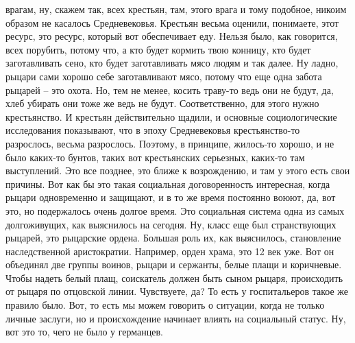 врагам, ну, скажем так, всех крестьян, там, этого врага и тому подобное, никоим
образом не касалось Средневековья. Крестьян весьма оценили, понимаете, этот
ресурс, это ресурс, который вот обеспечивает еду. Нельзя было, как говорится,
всех порубить, потому что, а кто будет кормить твою конницу, кто будет
заготавливать сено, кто будет заготавливать мясо людям и так далее. Ну ладно,
рыцари сами хорошо себе заготавливают мясо, потому что еще одна забота рыцарей –
это охота. Но, тем не менее, косить траву-то ведь они не будут, да, хлеб убирать
они тоже же ведь не будут. Соответственно, для этого нужно крестьянство. И
крестьян действительно щадили, и основные социологические исследования
показывают, что в эпоху Средневековья крестьянство-то разрослось, весьма
разрослось. Поэтому, в принципе, жилось-то хорошо, и не было каких-то бунтов,
таких вот крестьянских серьезных, каких-то там выступлений. Это все позднее, это
ближе к возрождению, и там у этого есть свои причины. Вот как бы это такая
социальная договоренность интересная, когда рыцари одновременно и защищают, и в
то же время постоянно воюют, да, вот это, но подержалось очень долгое время. Это
социальная система одна из самых долгоживущих, как выяснилось на сегодня. Ну,
класс еще был странствующих рыцарей, это рыцарские ордена. Большая роль их, как
выяснилось, становление наследственной аристократии. Например, орден храма, это
12 век уже. Вот он объединял две группы воинов, рыцари и сержанты, белые плащи и
коричневые. Чтобы надеть белый плащ, соискатель должен быть сыном рыцаря,
происходить от рыцаря по отцовской линии. Чувствуете, да? То есть у
госпитальеров такое же правило было. Вот, то есть мы можем говорить о ситуации,
когда не только личные заслуги, но и происхождение начинает влиять на социальный
статус. Ну, вот это то, чего не было у германцев. 

